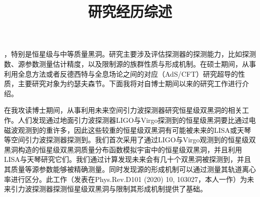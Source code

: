 \documentclass[12pt,a4paper,sans]{article}%
\title{\vspace{-2.5cm}\Huge 研究经历综述 \vspace{-2.2em}}
\date{}
\begin{document}
\begin{CJK}{UTF8}{gbsn}
	\maketitle
	，特别是恒星级与中等质量黑洞。研究主要涉及评估探测器的探测能力，比如探测数、源参数测量估计精度，以及限制源的族群性质与形成机制。在硕士期间，从事利用全息方法或者反德西特与全息场论之间的对应（AdS/CFT）研究超导的性质，主要研究对象为约瑟夫森节。下面我将对自博士期间以来的研究工作进行介绍。

	在我攻读博士期间，从事利用未来空间引力波探测器研究恒星级双黑洞的相关工作。人们发现通过地面引力波探测器LIGO与Virgo探测到的恒星级黑洞要比通过电磁波观测到的重许多，因此这些较重的恒星级双黑洞有可能被未来的LISA或天琴等空间引力波探测器探测到。我们首次采用了通过LIGO与Virgo观测到的恒星级双黑洞构造的恒星级双黑洞质量分布函数模拟宇宙中的恒星级双黑洞，并且利用LISA与天琴研究它们。我们通过计算发现未来会有几十个双黑洞被探测到，并且其质量等源参数能够被精确测量。同时发现源的形成机制可以通过测量其轨道离心率进行区分。此工作（发表在Phys.Rev.D101 (2020) 10, 103027，本人一作）为未来引力波探测器探测恒星级双黑洞与限制其形成机制提供了基础。


\end{CJK}
\end{document}
